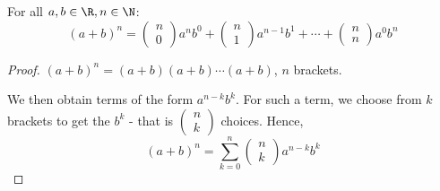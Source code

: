 \documentclass[../Main.tex]{subfiles}
\begin{document}
\begin{theorem}
    For all $a, b \in \R, n \in \N$:
    \begin{equation*}
        (a + b)^n = \begin{pmatrix}n \\ 0\end{pmatrix}a^n b^0 + \begin{pmatrix}n \\ 1\end{pmatrix}a^{n-1} b^1 + \cdots + \begin{pmatrix}n \\ n\end{pmatrix} a^0 b^n
    \end{equation*}
    \label{thmBinomial}
\end{theorem}
\begin{proof}
    $(a + b)^n = (a + b)(a + b) \cdots (a + b)$, $n$ brackets.\par
    We then obtain terms of the form $a^{n-k} b^k$. For such a term, we choose from $k$ brackets to get the $b^k$ - that is $\begin{pmatrix}n \\ k\end{pmatrix}$ choices. Hence,
    \begin{equation}
        (a + b)^n = \sum_{k=0}^{n} \begin{pmatrix}n \\ k\end{pmatrix} a^{n-k}{b^k}
    \end{equation}
\end{proof}
\end{document}
